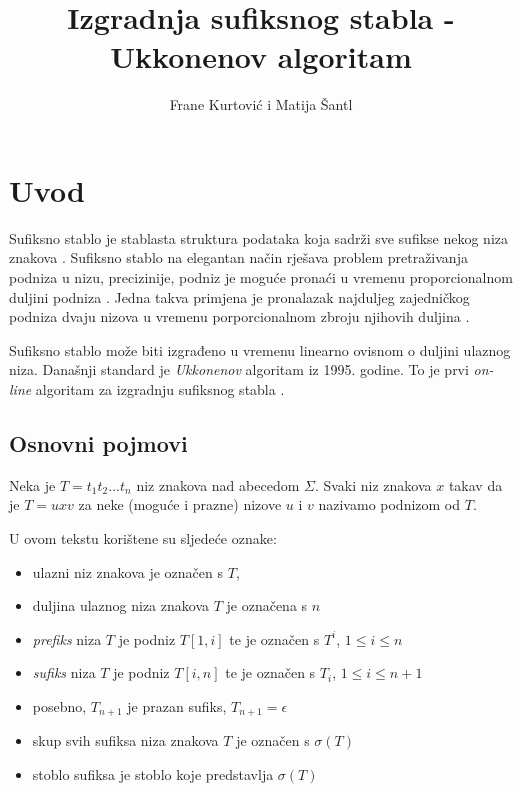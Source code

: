 \documentclass[times, utf8, seminar, numeric]{fer}
\begin{document}
\renewcommand{\figurename}{Slika}
\renewcommand{\tablename}{Tablica}
\renewcommand{\lstlistingname}{Programski odsječak}

\title{Izgradnja sufiksnog stabla - Ukkonenov algoritam}

\author{Frane Kurtović i Matija Šantl}


\maketitle

\tableofcontents

\chapter{Uvod}
Sufiksno stablo  je stablasta struktura podataka koja sadrži sve sufikse nekog niza znakova \cite{ukkonen}. Sufiksno stablo na elegantan način rješava problem pretraživanja podniza u nizu, precizinije, podniz je moguće pronaći u vremenu proporcionalnom duljini podniza \cite{mile}. Jedna takva primjena je pronalazak najduljeg zajedničkog podniza dvaju nizova u vremenu porporcionalnom zbroju njihovih duljina \cite{gusfield}.
	
	Sufiksno stablo može biti izgrađeno u vremenu linearno ovisnom o duljini ulaznog niza. Današnji standard je \textit{Ukkonenov} algoritam iz 1995. godine. To je prvi \textit{on-line} algoritam za izgradnju sufiksnog stabla \cite{mile}.
		
\section{Osnovni pojmovi}
	Neka je $T = t_1 t_2 ... t_n$ niz znakova nad abecedom $\Sigma$. Svaki niz znakova $x$ takav da je $T=u x v$ za neke (moguće i prazne) nizove $u$ i $v$ nazivamo podnizom od $T$.

U ovom tekstu korištene su sljedeće oznake:
\begin{itemize}
	\item ulazni niz znakova je označen s $T$,
	\item duljina ulaznog niza znakova $T$ je označena s $n$
	\item \textit{prefiks} niza $T$ je podniz $T[1, i]$ te je označen s $T^i$, $1 \le i \le n$
	\item \textit{sufiks} niza $T$ je podniz $T[i, n]$ te je označen s $T_i$, $1 \le i \le n + 1$
	\item posebno, $T_{n+1}$ je prazan sufiks, $T_{n+1} = \epsilon$
	\item skup svih sufiksa niza znakova $T$ je označen s $\sigma(T)$
	\item stoblo sufiksa  je stoblo koje predstavlja $\sigma(T)$
\end{itemize}
\end{document}
